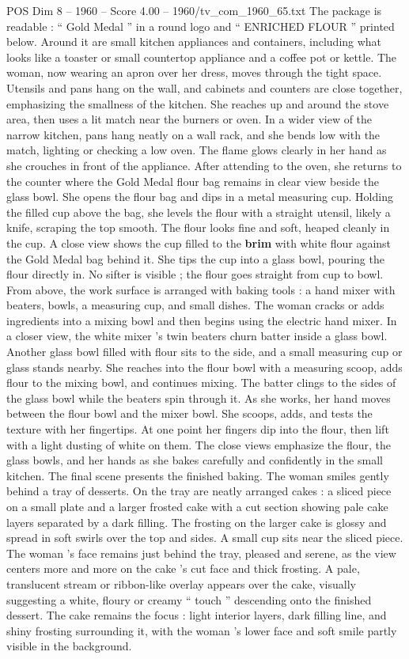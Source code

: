 \begin{textsample}{POS Dim 8 – 1960 – Score 4.00 – 1960/tv\_com\_1960\_65.txt}
The package is readable : “ Gold Medal ” in a round logo and “ ENRICHED FLOUR ” printed below.
Around it are small kitchen appliances and containers, including what looks like a toaster or small countertop appliance and a coffee pot or kettle.
The woman, now wearing an apron over her dress, moves through the tight space.
Utensils and pans hang on the wall, and cabinets and counters are close together, emphasizing the smallness of the kitchen.
She reaches up and around the stove area, then uses a lit match near the burners or oven.
In a wider view of the narrow kitchen, pans hang neatly on a wall rack, and she bends low with the match, lighting or checking a low oven.
The flame glows clearly in her hand as she crouches in front of the appliance.
After attending to the oven, she returns to the counter where the Gold Medal flour bag remains in clear view beside the glass bowl.
She opens the flour bag and dips in a metal measuring cup.
Holding the filled cup above the bag, she levels the flour with a straight utensil, likely a knife, scraping the top smooth.
The flour looks fine and soft, heaped cleanly in the cup.
A close view shows the cup filled to the \textbf{brim} with white flour against the Gold Medal bag behind it.
She tips the cup into a glass bowl, pouring the flour directly in.
No sifter is visible ; the flour goes straight from cup to bowl.
From above, the work surface is arranged with baking tools : a hand mixer with beaters, bowls, a measuring cup, and small dishes.
The woman cracks or adds ingredients into a mixing bowl and then begins using the electric hand mixer.
In a closer view, the white mixer ’s twin beaters churn batter inside a glass bowl.
Another glass bowl filled with flour sits to the side, and a small measuring cup or glass stands nearby.
She reaches into the flour bowl with a measuring scoop, adds flour to the mixing bowl, and continues mixing.
The batter clings to the sides of the glass bowl while the beaters spin through it.
As she works, her hand moves between the flour bowl and the mixer bowl.
She scoops, adds, and tests the texture with her fingertips.
At one point her fingers dip into the flour, then lift with a light dusting of white on them.
The close views emphasize the flour, the glass bowls, and her hands as she bakes carefully and confidently in the small kitchen.
The final scene presents the finished baking.
The woman smiles gently behind a tray of desserts.
On the tray are neatly arranged cakes : a sliced piece on a small plate and a larger frosted cake with a cut section showing pale cake layers separated by a dark filling.
The frosting on the larger cake is glossy and spread in soft swirls over the top and sides.
A small cup sits near the sliced piece.
The woman ’s face remains just behind the tray, pleased and serene, as the view centers more and more on the cake ’s cut face and thick frosting.
A pale, translucent stream or ribbon-like overlay appears over the cake, visually suggesting a white, floury or creamy “ touch ” descending onto the finished dessert.
The cake remains the focus : light interior layers, dark filling line, and shiny frosting surrounding it, with the woman ’s lower face and soft smile partly visible in the background.

\end{textsample}
